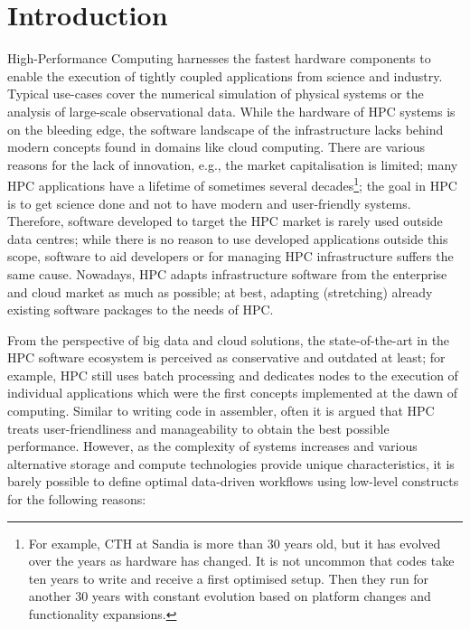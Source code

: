 \documentclass[a4paper, twocolumn]{article}
\begin{document}
\section{Introduction}

High-Performance Computing harnesses the fastest hardware components to enable
the execution of tightly coupled applications from science and industry.
Typical use-cases cover the numerical simulation of physical systems or the analysis of large-scale observational data.
While the hardware of HPC systems is on the bleeding edge, the software landscape of the infrastructure lacks behind modern concepts found in domains like cloud computing.
There are various reasons for the lack of innovation, e.g., the market capitalisation is limited; many HPC applications have a lifetime of sometimes several decades\footnote{For example, CTH at Sandia is more than 30 years old, but it has evolved over the years as hardware has changed.
It is not uncommon that codes take ten years to write and receive a first optimised setup.
Then they run for another 30 years with constant evolution based on platform changes and functionality expansions.}; the goal in HPC is to get science done and not to have modern and user-friendly systems.
Therefore, software developed to target the HPC market is rarely used outside data centres; while there is no reason to use developed applications outside this scope, software to aid developers or for managing HPC infrastructure suffers the same cause.
Nowadays, HPC adapts infrastructure software from the enterprise and cloud market as much as possible; at best, adapting (stretching) already existing software packages to the needs of HPC.

From the perspective of big data and cloud solutions, the state-of-the-art in the HPC software ecosystem is perceived as conservative and outdated at least; for example, HPC still uses batch processing and dedicates nodes to the execution of individual applications which were the first concepts implemented at the dawn of computing.
Similar to writing code in assembler, often it is argued that HPC treats user-friendliness and manageability to obtain the best possible performance.
However, as the complexity of systems increases and various alternative storage and compute technologies provide unique characteristics, it is barely possible to define optimal data-driven workflows using low-level constructs for the following reasons:
\end{document}

